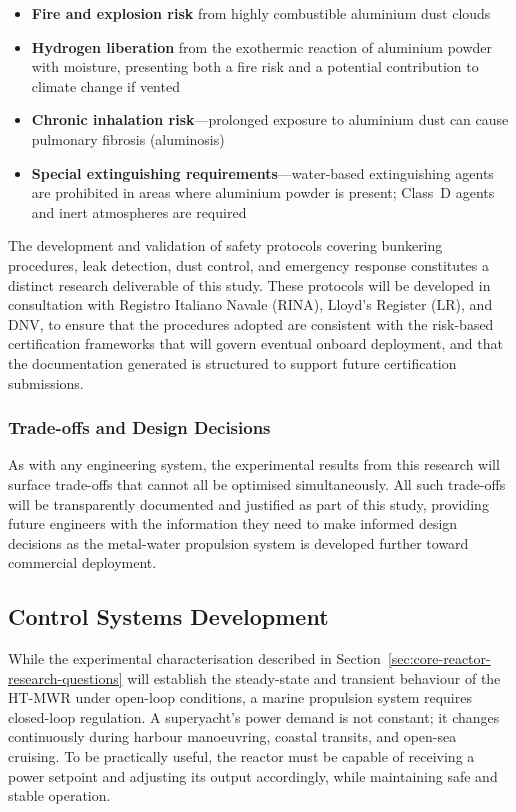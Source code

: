 \documentclass[12pt]{article}
\begin{document}
\begin{itemize}
    \item \textbf{Fire and explosion risk} from highly combustible aluminium dust 
    clouds
    \item \textbf{Hydrogen liberation} from the exothermic reaction of aluminium 
    powder with moisture, presenting both a fire risk and a potential contribution 
    to climate change if vented
    \item \textbf{Chronic inhalation risk}---prolonged exposure to aluminium dust 
    can cause pulmonary fibrosis (aluminosis)
    \item \textbf{Special extinguishing requirements}---water-based extinguishing 
    agents are prohibited in areas where aluminium powder is present; Class~D agents 
    and inert atmospheres are required
\end{itemize}

The development and validation of safety protocols covering bunkering procedures, 
leak detection, dust control, and emergency response constitutes a distinct research 
deliverable of this study. These protocols will be developed in consultation with 
Registro Italiano Navale (RINA), Lloyd's Register (LR), and DNV, to ensure that the 
procedures adopted are consistent with the risk-based certification frameworks that 
will govern eventual onboard deployment, and that the documentation generated is 
structured to support future certification submissions.

\subsubsection*{Trade-offs and Design Decisions}

As with any engineering system, the experimental results from this research will 
surface trade-offs that cannot all be optimised simultaneously. All such trade-offs 
will be transparently documented and justified as part of this study, providing 
future engineers with the information they need to make informed design decisions 
as the metal-water propulsion system is developed further toward commercial 
deployment.

\break

\subsection{Control Systems Development}
\label{sec:control-questions}

While the experimental characterisation described in Section~\ref{sec:core-reactor-research-questions} will establish the steady-state and transient behaviour of the HT-MWR under open-loop conditions, a marine propulsion system requires closed-loop regulation. A superyacht's power demand is not constant; it changes continuously during harbour manoeuvring, coastal transits, and open-sea cruising. To be practically useful, the reactor must be capable of receiving a power setpoint and adjusting its output accordingly, while maintaining safe and stable operation.
\end{document}
